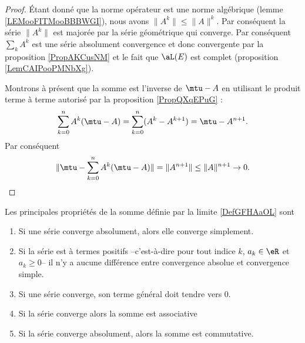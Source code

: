 \begin{proof}
    Étant donné que la norme opérateur est une norme algébrique (lemme \ref{LEMooFITMooBBBWGI}), nous avons \( \| A^k \|\leq \| A \|^k\). Par conséquent la série \( \| A^k \|\) est majorée par la série géométrique qui converge. Par conséquent \( \sum_{k}A^k\) est une série absolument convergence et donc convergente par la proposition \ref{PropAKCusNM} et le fait que \( \aL(E)\) est complet (proposition \ref{LemCAIPooPMNbXg}).
    
    Montrons à présent que la somme est l'inverse de \( \mtu-A\) en utilisant le produit terme à terme autorisé par la proposition \ref{PropQXqEPuG} :
    \begin{equation}
        \sum_{k=0}^nA^k(\mtu-A)=\sum_{k=0}^n(A^k-A^{k+1})=\mtu-A^{n+1}.
    \end{equation}
    Par conséquent 
    \begin{equation}
        \| \mtu-\sum_{k=0}^nA^k(\mtu-A) \|=\| A^{n+1} \|\leq \| A \|^{n+1}\to 0.
    \end{equation}
\end{proof}

\begin{proposition}\label{propnseries_propdebase}
Les principales propriétés de la somme définie par la limite \eqref{DefGFHAaOL} sont
  \begin{enumerate}
  \item Si une série converge absolument, alors elle converge simplement.
  \item Si la série est à termes positifs --c'est-à-dire pour tout indice $k$, $a_k \in \eR$ et $a_k \geq 0$-- il n'y a aucune différence entre convergence absolue et convergence simple.
  \item\label{point3-seriepropdebase} Si une série converge, son terme général doit tendre vers $0$.
\item 
Si la série converge alors la somme est associative
\item
Si la série converge absolument, alors la somme est commutative.
  \end{enumerate}
\end{proposition}

